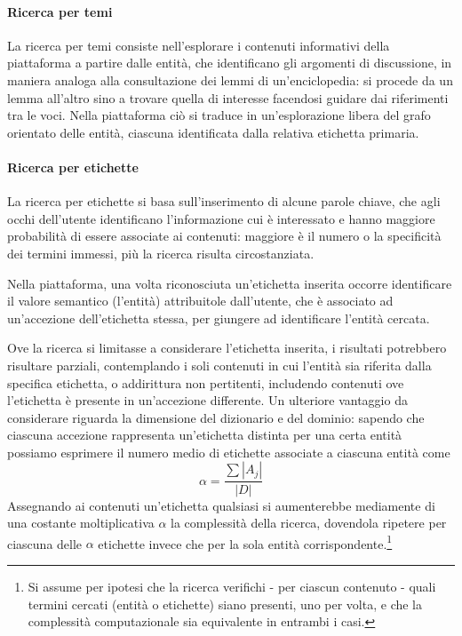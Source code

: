 \paragraph{Ricerca per temi}
La ricerca per temi consiste nell'esplorare i contenuti informativi della piattaforma a partire dalle entità, che identificano gli argomenti di discussione, in maniera analoga alla consultazione dei lemmi di un'enciclopedia: si procede da un lemma all'altro sino a trovare quella di interesse facendosi guidare dai riferimenti tra le voci. Nella piattaforma ciò si traduce in un'esplorazione libera del grafo orientato delle entità, ciascuna identificata dalla relativa etichetta primaria. 

\paragraph{Ricerca per etichette}
La ricerca per etichette si basa sull'inserimento di alcune parole chiave, che agli occhi dell'utente identificano l'informazione cui è interessato e hanno maggiore probabilità di essere associate ai contenuti: maggiore è il numero o la specificità dei termini immessi, più la ricerca risulta circostanziata.

Nella piattaforma, una volta riconosciuta un'etichetta inserita occorre identificare il valore semantico (l'entità) attribuitole dall'utente, che è associato ad un'accezione dell'etichetta stessa, per giungere ad identificare l'entità cercata.

Ove la ricerca si limitasse a considerare l’etichetta inserita, i risultati potrebbero risultare parziali, contemplando i soli contenuti in cui l’entità sia riferita dalla specifica etichetta, o addirittura non pertitenti, includendo contenuti ove l'etichetta è presente in un'accezione differente. Un ulteriore vantaggio da considerare riguarda la dimensione del dizionario e del dominio: sapendo che ciascuna accezione rappresenta un'etichetta distinta per una certa entità possiamo esprimere il numero medio di etichette associate a ciascuna entità come
\begin{equation}
\alpha = \frac{\sum{\left|A_j\right|}}{\left|D\right|}
\end{equation}
Assegnando ai contenuti un'etichetta qualsiasi si aumenterebbe mediamente di una costante moltiplicativa $\alpha$ la complessità della ricerca, dovendola ripetere per ciascuna delle $\alpha$ etichette invece che per la sola entità corrispondente.\footnote{Si assume per ipotesi che la ricerca verifichi - per ciascun contenuto - quali termini cercati (entità o etichette) siano presenti, uno per volta, e che la complessità computazionale sia equivalente in entrambi i casi.}


